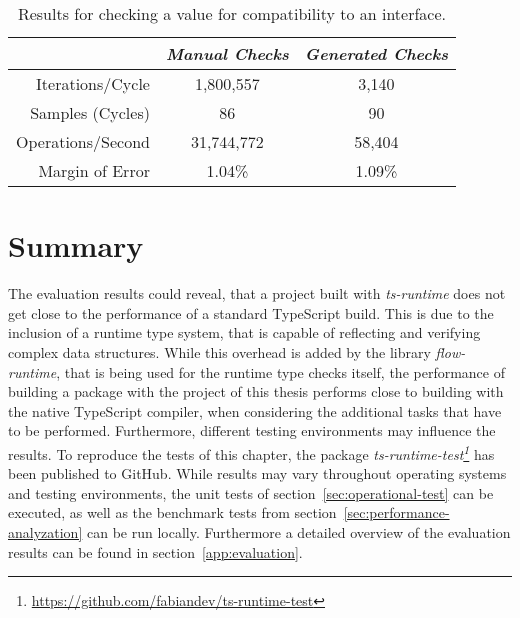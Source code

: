 \begin{table}[ht]
\begin{subtable}[ht]{1.0\textwidth}
    \setlength{\tabcolsep}{5mm}
    \def\arraystretch{1.25}
    \centering
    \begin{tabular}{|r||c|c|}
      \hline
      & \emph{Manual Checks} & \emph{Generated Checks} \\
      \hline
      \hline
      Iterations/Cycle & 1,800,557 & 3,140 \\
      \hline
      Samples (Cycles) & 86 & 90 \\
      \hline
      Operations/Second & 31,744,772 & 58,404 \\
      \hline
      Margin of Error & 1.04\% & 1.09\% \\
      \hline
    \end{tabular}
    \caption{Results for checking a value for compatibility to an interface.}
    \label{tab:benchmarks:interface}
  \end{subtable}
\end{table}

\section{Summary}
\label{sec:evaluation-summary}

The evaluation results could reveal, that a project built with \emph{ts-runtime} does not get close to the performance of a standard TypeScript build. This is due to the inclusion of a runtime type system, that is capable of reflecting and verifying complex data structures. While this overhead is added by the library \emph{flow-runtime}, that is being used for the runtime type checks itself, the performance of building a package with the project of this thesis performs close to building with the native TypeScript compiler, when considering the additional tasks that have to be performed. Furthermore, different testing environments may influence the results. To reproduce the tests of this chapter, the package \emph{ts-runtime-test\footnote{\url{https://github.com/fabiandev/ts-runtime-test}}} has been published to GitHub. While results may vary throughout operating systems and testing environments, the unit tests of section~\ref{sec:operational-test} can be executed, as well as the benchmark tests from section~\ref{sec:performance-analyzation} can be run locally. Furthermore a detailed overview of the evaluation results can be found in section~\ref{app:evaluation}.
